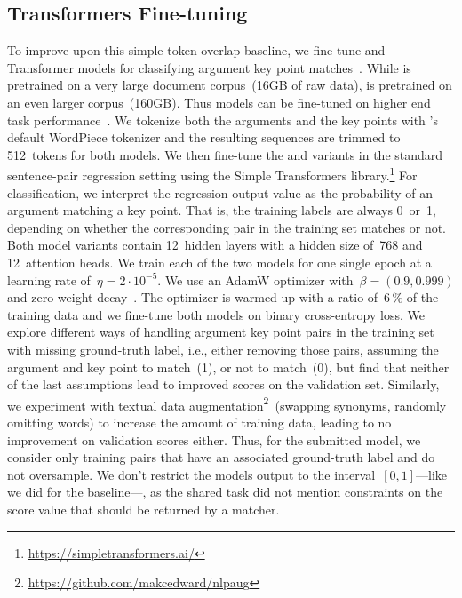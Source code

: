 \subsection{Transformers Fine-tuning}

To improve upon this simple token overlap baseline, we fine-tune \Bert and \Roberta Transformer models for classifying 
argument key point matches~\cite{DevlinCLT2019,LiuOGDJCLLZS2019}.
While \Bert is pretrained on a very large document corpus~(16GB of raw data), \Roberta is pretrained on an even larger corpus~(160GB).
Thus \Roberta models can be fine-tuned on higher end task performance~\cite{LiuOGDJCLLZS2019}.
We tokenize both the arguments and the key points with \Bert's default WordPiece tokenizer and the resulting sequences 
are trimmed to 512~tokens for both models.
We then fine-tune the \BertBase and \RobertaBase variants in the standard sentence-pair regression setting using 
the Simple Transformers library.\footnote{\url{https://simpletransformers.ai/}}
For classification, we interpret the regression output value as the probability of an argument matching a key point.
That is, the training labels are always 0~or~1, depending on whether the corresponding pair in the training set matches or not.
Both model variants contain 12~hidden layers with a hidden size of~768 and 12~attention heads.
We train each of the two models for one single epoch at a learning rate of~\( \eta = 2 \cdot 10^{-5} \).
We use an AdamW optimizer with~\( \beta = (0.9, 0.999) \) and zero weight decay~\cite{LoshchilovH2019}.
The optimizer is warmed up with a ratio of~6\,\% of the training data and we fine-tune both models on binary cross-entropy loss.
We explore different ways of handling argument key point pairs in the training set with missing ground-truth label, i.e., 
either removing those pairs, assuming the argument and key point to match~(1), or not to match~(0), but find that neither 
of the last assumptions lead to improved scores on the validation set.
Similarly, we experiment with textual data augmentation\footnote{\url{https://github.com/makcedward/nlpaug}}~(swapping synonyms, 
randomly omitting words) to increase the amount of training data, leading to no improvement on validation scores either.
Thus, for the submitted model, we consider only training pairs that have an associated ground-truth label and do not oversample.
We don't restrict the models output to the interval~\([0,1]\)---like we did for the baseline---, as the shared task did not 
mention constraints on the score value that should be returned by a matcher.
